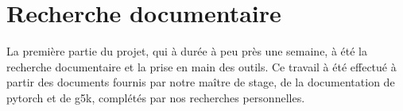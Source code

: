 \section{Recherche documentaire}
La première partie du projet, qui à durée à peu près une semaine, à été la recherche documentaire et la prise en main des outils.
Ce travail à été effectué à partir des documents fournis par notre maître de stage, de la documentation de \gls{pytorch}\autocite{60MinBlitzTorch,ByExampleTorch,Classify,doc_pytorch} et de \gls{g5k}, complétés par nos recherches personnelles.

